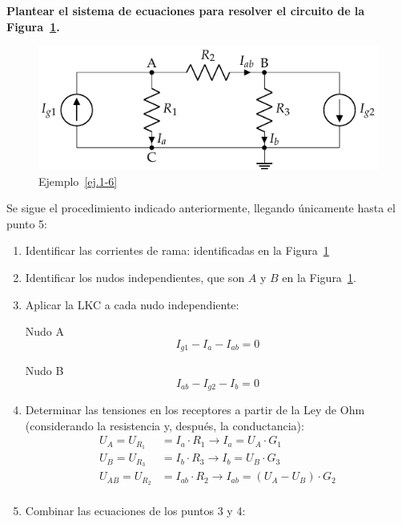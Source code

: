 	\begin{example}\label{ej.1-6}
          \textbf{Plantear el sistema de ecuaciones para resolver el
            circuito de la Figura~\ref{fig:nudos}.}
          \begin{figure}[H]
            \centering \includegraphics{../figs/nudos.pdf}
            \caption{Ejemplo~\ref{ej.1-6}}
            \label{fig:nudos}
          \end{figure}
		
          Se sigue el procedimiento indicado anteriormente, llegando
          únicamente hasta el punto 5:
		
          \begin{enumerate}
          \item Identificar las corrientes de rama: identificadas en
            la Figura~\ref{fig:nudos}
          \item Identificar los nudos independientes, que son $A$ y
            $B$ en la Figura~\ref{fig:nudos}.
          \item Aplicar la LKC a cada nudo independiente:
			
            Nudo A
            \begin{equation*}
              I_{g1} - I_a - I_{ab} = 0
            \end{equation*}
			
            Nudo B
            \begin{equation*}
              I_{ab} - I_{g2} - I_b = 0
            \end{equation*}
          \item Determinar las tensiones en los receptores a partir de
            la Ley de Ohm (considerando la resistencia y, después, la
            conductancia):
            \begin{align*}
              U_A = U_{R_1} &= I_a \cdot R_1\rightarrow I_a=U_A\cdot G_1\\
              U_B = U_{R_3} &= I_b \cdot R_3\rightarrow I_b=U_B\cdot G_3\\
              U_{AB}=U_{R_2} &= I_{ab} \cdot R_2\rightarrow I_{ab}=(U_A-U_B)\cdot G_2\\
            \end{align*}
          \item Combinar las ecuaciones de los puntos 3 y 4:
			

\end{enumerate}
\end{example}
